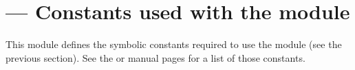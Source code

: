 \section{ ---
         Constants used with the  module}





This module defines the symbolic constants required to use the
 module (see the previous
section).  See the \POSIX{} or \UNIX{} manual pages for a list of
those constants.
